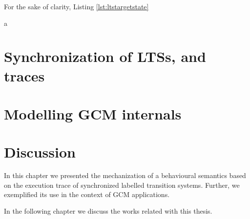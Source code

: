 	

	


	
	For the sake of clarity, Listing \ref{lst:ltstargetstate} 	
	
				
	
	
	\noindent a



\section{Synchronization of LTSs, and traces}
\label{sec:pnet}




\section{Modelling GCM internals}
\label{sec:gcmpnets}



\section{Discussion}
\label{sec:behaviourdiscussion}


\chapbreak

	In this chapter we presented the mechanization of a behavioural 
semantics based on the execution trace of synchronized labelled transition systems. Further, we
exemplified its use in the context of \ac{GCM} applications.
	
	In the following chapter we discuss the works related with this thesis.



